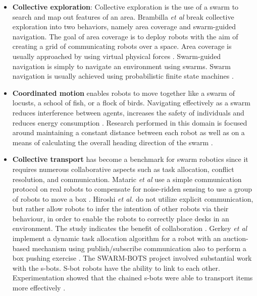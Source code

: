 \begin{itemize}
\item \textbf{Collective exploration}: Collective exploration is the use of a swarm to search and map out features of an area. Brambilla \textit{et al} \cite{brambilla2013swarm} break collective exploration into two behaviors, namely area coverage and swarm-guided navigation. The goal of area coverage is to deploy robots with the aim of creating a grid of communicating robots over a space. Area coverage is usually approached by using virtual physical forces \cite{howard2002mobile,stirling2010energy}.
Swarm-guided navigation is simply to navigate an environment using swarms. Swarm navigation is usually achieved using probabilistic finite state machines \cite{payton2001pheromone,ducatelle2011self}. 

\item \textbf{Coordinated motion} 
enables robots to move together like a swarm of locusts, a school of fish, or a flock of birds. Navigating effectively as a swarm reduces interference between agents, increases the safety of individuals and reduces energy consumption \cite{parrish2002self}. Research performed in this domain is focused around maintaining a constant distance between each robot as well as on a means of calculating the overall heading direction of the swarm \cite{turgut2008self,ferrante2010flocking,baldassarre2003evolving}.

\item \textbf{Collective transport} has become a benchmark for swarm robotics since it requires numerous collaborative aspects such as task allocation, conflict resolution, and communication. Mataric \textit{et al} use a simple communication protocol on real robots to compensate for noise-ridden sensing to use a group of robots to move a box \cite{mataric1995cooperative}. Hiroshi \textit{et al.} do not utilize explicit communication, but rather allow robots to infer the intention of other robots via their behaviour, in order to enable the robots to correctly place desks in an environment. The study indicates the benefit of collaboration \cite{sugie1995placing}. Gerkey \textit{et al} implement a dynamic task allocation algorithm for a robot with an auction-based mechanism using publish/subscribe communication also to perform a box pushing exercise \cite{gerkey2002sold}. The SWARM-BOTS project involved substantial work with the s-bots. S-bot robots have the ability to link to each other. Experimentation showed that the chained s-bots were able to transport items more effectively \cite{gross2004group, dorigo2005swarm, ferrante2013socially}.

\end{itemize}
		
